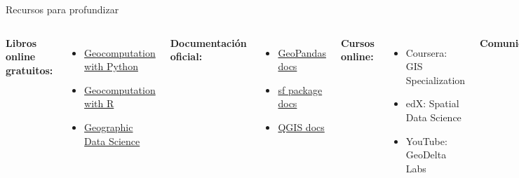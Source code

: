\documentclass[10pt]{beamer}
\begin{document}
\begin{frame}{Recursos para profundizar}
    \begin{columns}
        \textbf{Libros online gratuitos:}
        \begin{itemize}
            \item \href{https://py.geocompx.org}{Geocomputation with Python}
            \item \href{https://r.geocompx.org}{Geocomputation with R}
            \item \href{https://geographicdata.science/book}{Geographic Data Science}
        \end{itemize}
        
        \vspace{0.3cm}
        \textbf{Documentación oficial:}
        \begin{itemize}
            \item \href{https://geopandas.org}{GeoPandas docs}
            \item \href{https://r-spatial.github.io/sf/}{sf package docs}
            \item \href{https://docs.qgis.org}{QGIS docs}
        \end{itemize}
        
        \textbf{Cursos online:}
        \begin{itemize}
            \item Coursera: GIS Specialization
            \item edX: Spatial Data Science
            \item YouTube: GeoDelta Labs
        \end{itemize}
        
        \vspace{0.3cm}
        \textbf{Comunidades:}
        \begin{itemize}
            \item {} Stack Overflow GIS
            \item {} r/gis
            \item {} \#gischat
            \item {} awesome-gis
        \end{itemize}
    \end{columns}
\end{frame}
\end{document}
